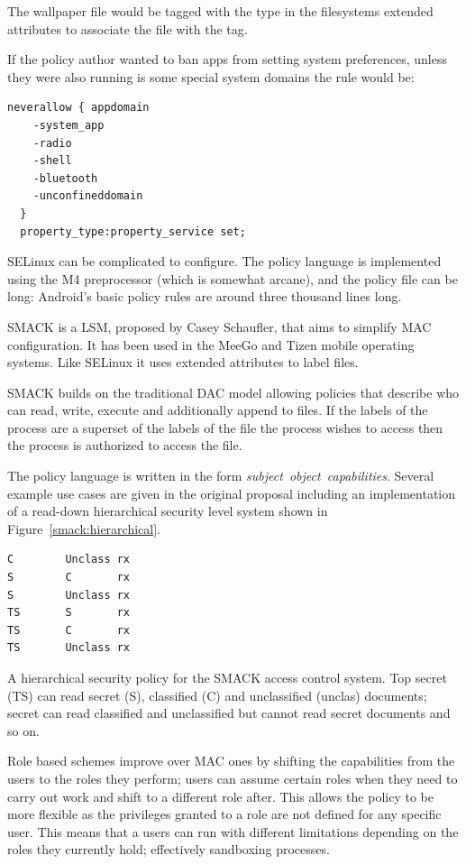\documentclass[a4paper]{article}
\begin{document}
The wallpaper file would be tagged with the  type in the
filesystems extended attributes to associate the file with the tag.

If the policy author wanted to ban apps from setting system preferences, unless
they were also running is some special system domains the rule would be:

\begin{lstlisting}[language=selinux]
neverallow { appdomain 
    -system_app 
    -radio 
    -shell 
    -bluetooth 
    -unconfineddomain
  }
  property_type:property_service set;
\end{lstlisting}

SELinux can be complicated to configure.  The policy language is implemented
using the M4 preprocessor (which is somewhat arcane), and the policy file can be
long: Android's basic policy rules are around three thousand lines long.

SMACK is a \ac{LSM}, proposed by Casey Schaufler\cite{Shaufler:_OMTJQq8}, that
aims to simplify \ac{MAC} configuration.  It has been used in the MeeGo and
Tizen mobile operating systems.  Like SELinux it uses extended attributes to
label files.

SMACK builds on the traditional \ac{DAC} model allowing policies that describe
who can read, write, execute and additionally append to files.  If the labels of
the process are a superset of the labels of the file the process wishes to
access then the process is authorized to access the file.

The policy language is written in the form \emph{subject~object~capabilities}.
Several example use cases are given in the original proposal including an
implementation of a read-down hierarchical security level system shown in
Figure~\ref{smack:hierarchical}.

\begin{marginfigure}
  \begin{lstlisting}
C        Unclass rx
S        C       rx
S        Unclass rx
TS       S       rx
TS       C       rx
TS       Unclass rx
  \end{lstlisting}
  \caption{A hierarchical security policy for the SMACK access control system.
    Top secret (TS) can read secret (S), classified (C) and unclassified
    (unclas) documents; secret can read classified and unclassified but cannot
  read secret documents and so on.}
  \label{smack:hierarchical}
\end{marginfigure}

Role based schemes
improve over \ac{MAC} ones by shifting the capabilities from the users to the
roles they perform; users can assume certain roles when they need to carry out
work and shift to a different role after.  This allows the policy to be more
flexible as the privileges granted to a role are not defined for any specific
user.  This means that a users can run with different limitations
depending on the roles they currently hold; effectively sandboxing processes.
\end{document}
